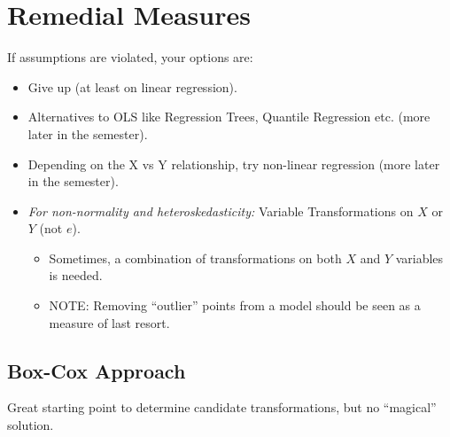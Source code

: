 \documentclass[12pt]{../notes}
\begin{document}
\section{Remedial Measures}

If assumptions are violated, your options are:
\begin{itemize}
\item Give up (at least on linear regression). 
\item Alternatives to OLS like Regression Trees, Quantile Regression etc. (more later in the semester). 
\item Depending on the X vs Y relationship, try non-linear regression (more later in the semester). 
\item \textit{For non-normality and heteroskedasticity:} Variable Transformations on $X$ or $Y$ (not $e$). 
\begin{itemize}
\item Sometimes, a combination of transformations on both $X$ and $Y$ variables is needed. 
\item NOTE: Removing ``outlier'' points from a model should be seen as a measure of last resort. 
\end{itemize}
\end{itemize}

\subsection*{Box-Cox Approach}
Great starting point to determine candidate transformations, but no ``magical'' solution. 
\end{document}

